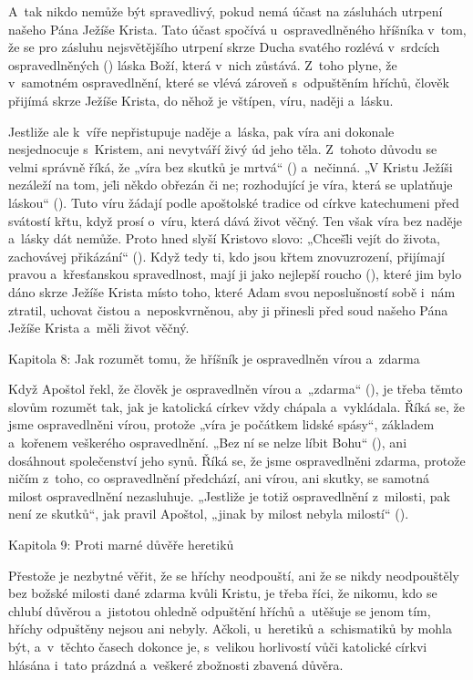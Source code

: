 A~tak nikdo nemůže být spravedlivý, pokud nemá účast na zásluhách utrpení našeho
Pána Ježíše Krista. Tato účast spočívá u~ospravedlněného hříšníka v~tom, že se pro
zásluhu nejsvětějšího utrpení skrze Ducha svatého rozlévá v~srdcích ospravedlněných
() láska Boží, která v~nich zůstává. Z~toho plyne, že v~samotném ospravedlnění,
které se vlévá zároveň s~odpuštěním hříchů, člověk přijímá skrze Ježíše Krista, do
něhož je vštípen, víru, naději a~lásku.

Jestliže ale k~víře nepřistupuje naděje a~láska, pak víra ani dokonale nesjednocuje
s~Kristem, ani nevytváří živý úd jeho těla. Z~tohoto důvodu se velmi správně říká,
že „víra bez skutků je mrtvá“ () a~nečinná. „V Kristu Ježíši nezáleží
na tom, je\=li někdo obřezán či ne; rozhodující je víra, která se uplatňuje láskou“
(). Tuto víru žádají podle apoštolské tradice od církve katechumeni
před svátostí křtu, když prosí o~víru, která dává život věčný. Ten však víra bez
naděje a~lásky dát nemůže. Proto hned slyší Kristovo slovo: „Chceš\=li vejít do života,
zachovávej přikázání“ (). Když tedy ti, kdo jsou křtem znovuzrození, přijímají
pravou a~křesťanskou spravedlnost, mají ji jako nejlepší roucho (), které
jim bylo dáno skrze Ježíše Krista místo toho, které Adam svou neposlušností sobě
i~nám ztratil, uchovat čistou a~neposkvrněnou, aby ji přinesli před soud našeho Pána
Ježíše Krista a~měli život věčný.

\chaptitle
Kapitola 8:
Jak rozumět tomu, že hříšník je ospravedlněn vírou a~zdarma

Když Apoštol řekl, že člověk je ospravedlněn vírou a~„zdarma“ (), je
třeba těmto slovům rozumět tak, jak je katolická církev vždy chápala a~vykládala.
Říká se, že jsme ospravedlněni vírou, protože „víra je počátkem lidské spásy“, základem
a~kořenem veškerého ospravedlnění. „Bez ní se nelze líbit Bohu“ (), ani
dosáhnout společenství jeho synů. Říká se, že jsme ospravedlněni zdarma, protože
ničím z~toho, co ospravedlnění předchází, ani vírou, ani skutky, se samotná milost
ospravedlnění nezasluhuje. „Jestliže je totiž ospravedlnění z~milosti, pak není
ze skutků“, jak pravil Apoštol, „jinak by milost nebyla milostí“ ().

\chaptitle
Kapitola 9:
Proti marné důvěře heretiků

Přestože je nezbytné věřit, že se hříchy neodpouští, ani že se nikdy neodpouštěly
bez božské milosti dané zdarma kvůli Kristu, je třeba říci, že nikomu, kdo se chlubí
důvěrou a~jistotou ohledně odpuštění hříchů a~utěšuje se jenom tím, hříchy odpuštěny
nejsou ani nebyly. Ačkoli, u~heretiků a~schismatiků by mohla být, a~v~těchto časech
dokonce je, s~velikou horlivostí vůči katolické církvi hlásána i~tato prázdná a~veškeré
zbožnosti zbavená důvěra.

